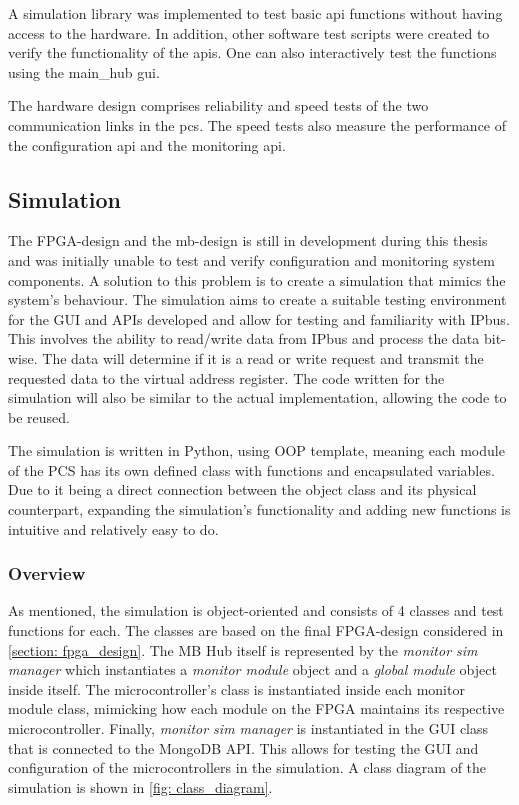 \documentclass[main.tex]{subfiles}
\begin{document}
A simulation library was implemented to test basic \gls{api} functions without having access to the hardware. In addition, other software test scripts were created to verify the functionality of the \gls{api}s. One can also interactively test the functions using the main\_hub \gls{gui}. 

The hardware design comprises reliability and speed tests of the two communication links in the \gls{pcs}. The speed tests also measure the performance of the configuration \gls{api} and the monitoring \gls{api}.


\subsection{Simulation}

The FPGA-design and the \gls{mb}-design is still in development during this thesis and was initially unable to test and verify configuration and monitoring system components. A solution to this problem is to create a simulation that mimics the system's behaviour. The simulation aims to create a suitable testing environment for the GUI and APIs developed and allow for testing and familiarity with IPbus. This involves the ability to read/write data from IPbus and process the data bit-wise. The data will determine if it is a read or write request and transmit the requested data to the virtual address register. The code written for the simulation will also be similar to the actual implementation, allowing the code to be reused.

The simulation is written in Python, using OOP template, meaning each module of the PCS has its own defined class with functions and encapsulated variables. Due to it being a direct connection between the object class and its physical counterpart, expanding the simulation's functionality and adding new functions is intuitive and relatively easy to do.

\subsubsection{Overview}
As mentioned, the simulation is object-oriented and consists of 4 classes and test functions for each. The classes are based on the final FPGA-design considered in \autoref{section: fpga_design}. The MB Hub itself is represented by the \textit{monitor sim manager} which instantiates a \textit{monitor module} object and a \textit{global module} object inside itself. The microcontroller's class is instantiated inside each monitor module class, mimicking how each module on the FPGA maintains its respective microcontroller. Finally, \textit{monitor sim manager} is instantiated in the GUI class that is connected to the MongoDB API. This allows for testing the GUI and configuration of the microcontrollers in the simulation. A class diagram of the simulation is shown in \ref{fig: class_diagram}.
\end{document}
